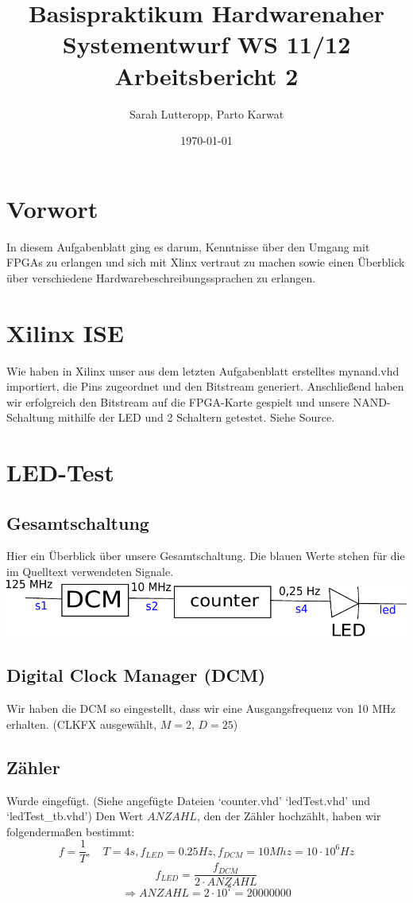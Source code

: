 \documentclass[a4paper, 11pt]{article}
\author{Sarah Lutteropp, Parto Karwat}
\title{Basispraktikum Hardwarenaher Systementwurf WS 11/12 \\ Arbeitsbericht 2}
\date{\today}
\theoremstyle{definition}
\theoremstyle{plain}
\begin{document}
\maketitle

\section{Vorwort}
In diesem Aufgabenblatt ging es darum, Kenntnisse über den Umgang mit FPGAs zu erlangen und sich mit Xlinx vertraut zu machen sowie einen Überblick über verschiedene Hardwarebeschreibungssprachen zu erlangen.

\section{Xilinx ISE}
Wie haben in Xilinx unser aus dem letzten Aufgabenblatt erstelltes mynand.vhd importiert, die Pins zugeordnet und den Bitstream generiert. Anschließend haben wir erfolgreich den Bitstream auf die FPGA-Karte gespielt und unsere NAND-Schaltung mithilfe der LED und 2 Schaltern getestet. 
Siehe Source.

\section{LED-Test}
\subsection{Gesamtschaltung}
Hier ein Überblick über unsere Gesamtschaltung. Die blauen Werte stehen für die im Quelltext verwendeten Signale.
\includegraphics[width=1\textwidth]{partosBild.pdf}

\subsection{Digital Clock Manager (DCM)}
Wir haben die DCM so eingestellt, dass wir eine Ausgangsfrequenz von 10 MHz erhalten. (CLKFX ausgewählt, $M=2$, $D=25$)

\subsection{Zähler}
Wurde eingefügt. (Siehe angefügte Dateien `counter.vhd' `ledTest.vhd' und `ledTest\_tb.vhd')
Den Wert $ANZAHL$, den der Zähler hochzählt, haben wir folgendermaßen bestimmt:
$$f=\frac{1}{T}, \quad T=4 s, f_{LED} = 0.25 Hz, f_{DCM} = 10 Mhz = 10 \cdot 10^6 Hz$$
$$ f_{LED} = \frac{f_{DCM}}{2 \cdot ANZAHL}$$
$$\Rightarrow ANZAHL = 2 \cdot 10^7 = 20000000$$
\end{document}

